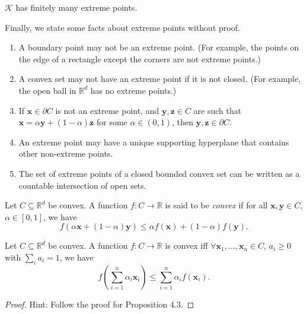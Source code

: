 \begin{cor}
    $\mathcal{K}$ has finitely many extreme points.
\end{cor}

Finally, we state some facts about extreme points without proof. 

\begin{enumerate}
    \item A boundary point may not be an extreme point. (For example, the points on the edge of a rectangle except the corners are not extreme points.)

    \item A convex set may not have an extreme point if it is not closed. (For example, the open ball in $\mathbb{R}^d$ has no extreme points.)

    \item If $\mathbf{x} \in \partial C$ is not an extreme point, and $\mathbf{y}, \mathbf{z} \in C$ are such that $\mathbf{x} = \alpha \mathbf{y} + (1-\alpha)\mathbf{z}$ for some $\alpha \in (0,1)$, then $\mathbf{y}, \mathbf{z} \in \partial C$. 

    \item An extreme point may have a unique supporting hyperplane that contains other non-extreme points. 

    \item The set of extreme points of a closed bounded convex set can be written as a countable intersection of open sets. 
\end{enumerate}

\begin{defn}
    Let $C \subseteq \mathbb{R}^d$ be convex. A function $f \colon C \to \mathbb{R}$ is said to be \emph{convex} if for all $\mathbf{x}, \mathbf{y} \in C$, $\alpha \in [0,1]$, we have
    \[
        f\left( \alpha \mathbf{x} + (1-\alpha)\mathbf{y} \right) \leq \alpha f(\mathbf{x}) + (1-\alpha) f(\mathbf{y}).
    \]
\end{defn}
\begin{prop}
    Let $C \subseteq \mathbb{R}^d$ be convex. A function $f \colon C \to \mathbb{R}$ is convex iff $\forall\mathbf{x}_1, \ldots, \mathbf{x}_n \in C$, $a_i \geq 0$ with $\sum_i a_i =1$, we have
    \[
        f\left( \sum_{i=1}^n \alpha_i \mathbf{x}_i \right) \leq \sum_{i=1}^n \alpha_i f(\mathbf{x}_i).
    \]
\end{prop}
\begin{proof}
    Hint: Follow the proof for Proposition 4.3.
\end{proof}

